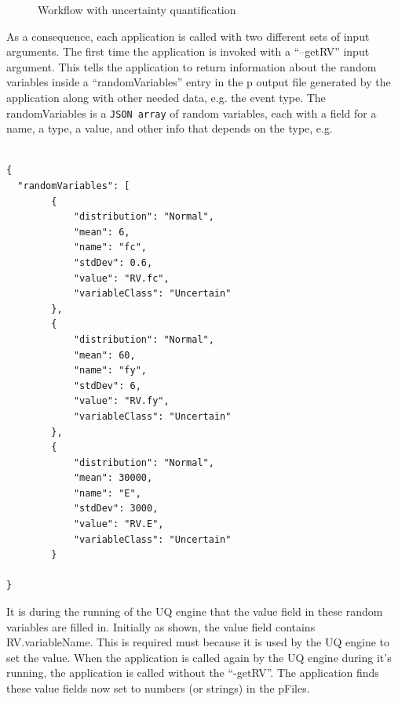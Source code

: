 \begin{figure}[!htbp]
  \caption{Workflow with uncertainty quantification}
  \label{fig:figure18}
\end{figure}

As a consequence, each application is called with two different sets of
input arguments. The first time the application is invoked with a
“–getRV” input argument. This tells the application to return
information about the random variables inside a “randomVariables”
entry in the p output file generated by the application along with
other needed data, e.g. the event type. The randomVariables is a
\texttt{JSON array} of random variables, each with a field for a name,
a type, a value, and other info that depends on the type, e.g. \\ \\


\begin{lstlisting}
{
  "randomVariables": [
        {
            "distribution": "Normal",
            "mean": 6,
            "name": "fc",
            "stdDev": 0.6,
            "value": "RV.fc",
            "variableClass": "Uncertain"
        },
        {
            "distribution": "Normal",
            "mean": 60,
            "name": "fy",
            "stdDev": 6,
            "value": "RV.fy",
            "variableClass": "Uncertain"
        },
        {
            "distribution": "Normal",
            "mean": 30000,
            "name": "E",
            "stdDev": 3000,
            "value": "RV.E",
            "variableClass": "Uncertain"
        }

}
\end{lstlisting}

It is during the running of the UQ engine that the value field in
these random variables are filled in. Initially as shown, the value
field contains RV.variableName.  This is required must because it is used by
the UQ engine to set the value. When the application is called
again by the UQ engine during it’s running, the application is
called without the “-getRV”. The application finds these value fields
now set to numbers (or strings) in the pFiles. \\

